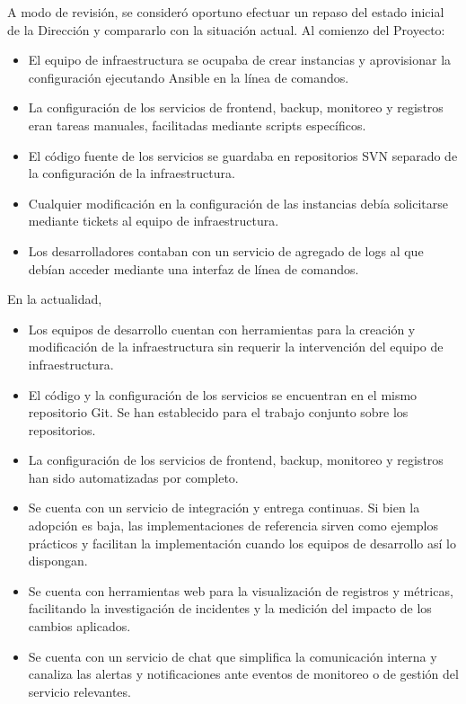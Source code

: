 A modo de revisión, se consideró oportuno efectuar un repaso del
estado inicial de la Dirección y compararlo con la situación
actual. Al comienzo del Proyecto:
%
\begin{itemize}
\item El equipo de infraestructura se ocupaba de crear instancias y
  aprovisionar la configuración ejecutando Ansible en la línea de
  comandos.
\item La configuración de los servicios de frontend, backup, monitoreo
  y registros eran tareas manuales, facilitadas mediante scripts
  específicos.
\item El código fuente de los servicios se guardaba en repositorios
  SVN separado de la configuración de la infraestructura.
\item Cualquier modificación en la configuración de las instancias
  debía solicitarse mediante tickets al equipo de infraestructura.
\item Los desarrolladores contaban con un servicio de agregado de logs
  al que debían acceder mediante una interfaz de línea de comandos.
\end{itemize}
%
En la actualidad,
%
\begin{itemize}
\item Los equipos de desarrollo cuentan con herramientas para la
  creación y modificación de la infraestructura sin requerir la
  intervención del equipo de infraestructura.
\item El código y la configuración de los servicios se encuentran en
  el mismo repositorio Git. Se han establecido para el trabajo
  conjunto sobre los repositorios.
\item La configuración de los servicios de frontend, backup, monitoreo
  y registros han sido automatizadas por completo.
\item Se cuenta con un servicio de integración y entrega continuas. Si
  bien la adopción es baja, las implementaciones de referencia sirven
  como ejemplos prácticos y facilitan la implementación cuando los
  equipos de desarrollo así lo dispongan.
\item Se cuenta con herramientas web para la visualización de
  registros y métricas, facilitando la investigación de incidentes y
  la medición del impacto de los cambios aplicados.
\item Se cuenta con un servicio de chat que simplifica la comunicación
  interna y canaliza las alertas y notificaciones ante eventos de
  monitoreo o de gestión del servicio relevantes.
\end{itemize}
%
%
%
